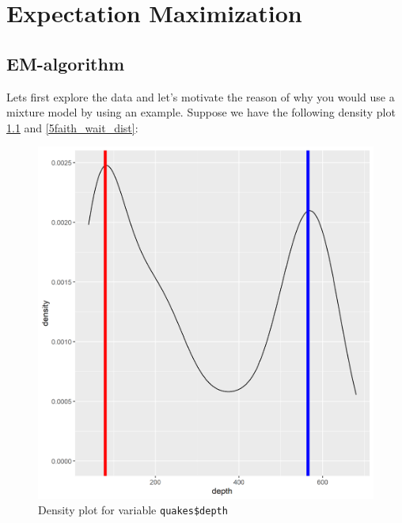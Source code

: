 \chapter{Expectation Maximization}

\section{EM-algorithm}
Lets first explore the data and let’s motivate the reason of why you would use a mixture model by using an example. Suppose we have the following density plot \ref{5quakes_depth_dist} and \ref{5faith_wait_dist}:

\begin{figure}[h]
\centering
\includegraphics[scale=0.75, keepaspectratio]{ex5/5quakes_depth_dist.png}
\caption{Density plot for  variable \texttt{quakes\$depth}}
\label{5quakes_depth_dist}
\end{figure} 



